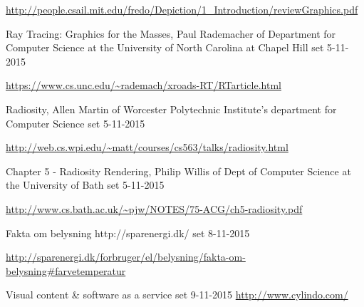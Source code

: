 \begin{thebibliography}{99}
  \url{http://people.csail.mit.edu/fredo/Depiction/1_Introduction/reviewGraphics.pdf}

  Ray Tracing: Graphics for the Masses, 
  Paul Rademacher of Department for Computer Science at the University of North Carolina at Chapel Hill
  set 5-11-2015

  \url{https://www.cs.unc.edu/~rademach/xroads-RT/RTarticle.html}

  Radiosity,
  Allen Martin of Worcester Polytechnic Institute's department for Computer Science
  set 5-11-2015

  \url{http://web.cs.wpi.edu/~matt/courses/cs563/talks/radiosity.html}

  Chapter 5 - Radiosity Rendering,
  Philip Willis of Dept of Computer Science at the University of Bath
  set 5-11-2015

  \url{http://www.cs.bath.ac.uk/~pjw/NOTES/75-ACG/ch5-radiosity.pdf}
  
  Fakta om belysning
  http://sparenergi.dk/
  set 8-11-2015
  
  \url{http://sparenergi.dk/forbruger/el/belysning/fakta-om-belysning#farvetemperatur}

  Visual content & software as a service
  set 9-11-2015
  \url{http://www.cylindo.com/}

\end{thebibliography}
\clearpage